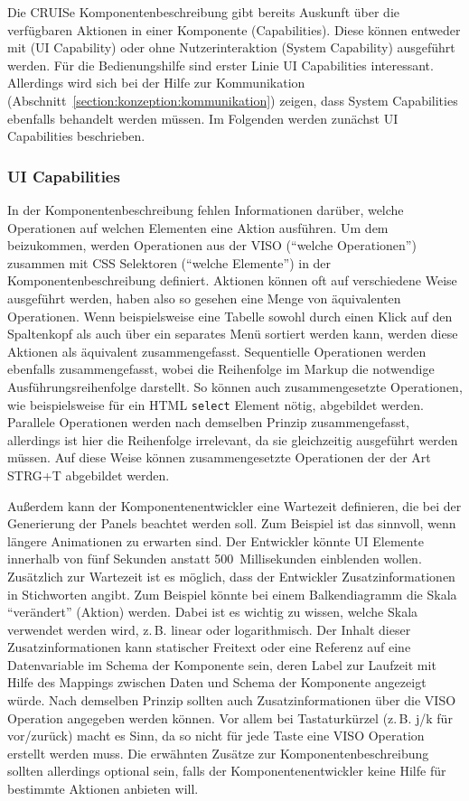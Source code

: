 \documentclass[
	headsepline,
	footsepline,
	fontsize=12pt,
	bibliography=totoc
]{scrbook}
\begin{document}
Die CRUISe Komponentenbeschreibung gibt bereits Auskunft über die verfügbaren Aktionen in einer Komponente (Capabilities). Diese können entweder mit (UI Capability) oder ohne Nutzerinteraktion (System Capability) ausgeführt werden. Für die Bedienungshilfe sind erster Linie UI Capabilities interessant. Allerdings wird sich bei der Hilfe zur Kommunikation (Abschnitt~\ref{section:konzeption:kommunikation}) zeigen, dass System Capabilities ebenfalls behandelt werden müssen. Im Folgenden werden zunächst UI Capabilities beschrieben.

\subsubsection{UI Capabilities}

In der Komponentenbeschreibung fehlen Informationen darüber, welche Operationen auf welchen Elementen eine Aktion ausführen. Um dem beizukommen, werden Operationen aus der VISO (\enquote{welche Operationen}) zusammen mit CSS Selektoren (\enquote{welche Elemente}) in der Komponentenbeschreibung definiert. Aktionen können oft auf verschiedene Weise ausgeführt werden, haben also so gesehen eine Menge von äquivalenten Operationen. Wenn beispielsweise eine Tabelle sowohl durch einen Klick auf den Spaltenkopf als auch über ein separates Menü sortiert werden kann, werden diese Aktionen als äquivalent zusammengefasst. Sequentielle Operationen werden ebenfalls zusammengefasst, wobei die Reihenfolge im Markup die notwendige Ausführungsreihenfolge darstellt. So können auch zusammengesetzte Operationen, wie beispielsweise für ein HTML \texttt{select} Element nötig, abgebildet werden. Parallele Operationen werden nach demselben Prinzip zusammengefasst, allerdings ist hier die Reihenfolge irrelevant, da sie gleichzeitig ausgeführt werden müssen. Auf diese Weise können zusammengesetzte Operationen der der Art STRG+T abgebildet werden.

Außerdem kann der Komponentenentwickler eine Wartezeit definieren, die bei der Generierung der Panels beachtet werden soll. Zum Beispiel ist das sinnvoll, wenn längere Animationen zu erwarten sind. Der Entwickler könnte UI Elemente innerhalb von fünf Sekunden anstatt 500~Millisekunden einblenden wollen. Zusätzlich zur Wartezeit ist es möglich, dass der Entwickler Zusatzinformationen in Stichworten angibt. Zum Beispiel könnte bei einem Balkendiagramm die Skala \enquote{verändert} (Aktion) werden. Dabei ist es wichtig zu wissen, welche Skala verwendet werden wird, z.\,B. linear oder logarithmisch. Der Inhalt dieser Zusatzinformationen kann statischer Freitext oder eine Referenz auf eine Datenvariable im Schema der Komponente sein, deren Label zur Laufzeit mit Hilfe des Mappings zwischen Daten und Schema der Komponente angezeigt würde. Nach demselben Prinzip sollten auch Zusatzinformationen über die VISO Operation angegeben werden können. Vor allem bei Tastaturkürzel (z.\,B. j/k für vor/zurück) macht es Sinn, da so nicht für jede Taste eine VISO Operation erstellt werden muss. Die erwähnten Zusätze zur Komponentenbeschreibung sollten allerdings optional sein, falls der Komponentenentwickler keine Hilfe für bestimmte Aktionen anbieten will.
\end{document}
